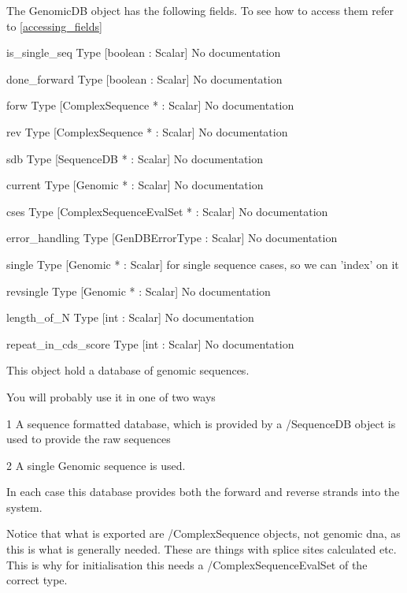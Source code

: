 The GenomicDB object has the following fields. To see how to access them refer to \ref{accessing_fields}
\begin{description}
\item{is_single_seq} Type [boolean : Scalar] No documentation

\item{done_forward} Type [boolean : Scalar] No documentation

\item{forw} Type [ComplexSequence * : Scalar] No documentation

\item{rev} Type [ComplexSequence * : Scalar] No documentation

\item{sdb} Type [SequenceDB * : Scalar] No documentation

\item{current} Type [Genomic * : Scalar] No documentation

\item{cses} Type [ComplexSequenceEvalSet * : Scalar] No documentation

\item{error_handling} Type [GenDBErrorType : Scalar] No documentation

\item{single} Type [Genomic * : Scalar]  for single sequence cases, so we can 'index' on it 

\item{revsingle} Type [Genomic * : Scalar] No documentation

\item{length_of_N} Type [int : Scalar] No documentation

\item{repeat_in_cds_score} Type [int : Scalar] No documentation

\end{description}
This object hold a database of
genomic sequences.


You will probably use it in one of
two ways


1 A sequence formatted database, which
is provided by a /SequenceDB object
is used to provide the raw sequences 


2 A single Genomic sequence is used.


In each case this database provides
both the forward and reverse strands
into the system.


Notice that what is exported are
/ComplexSequence objects, not genomic dna,
as this is what is generally needed. 
These are things with splice sites calculated
etc. This is why for initialisation this needs
a /ComplexSequenceEvalSet of the correct type.




